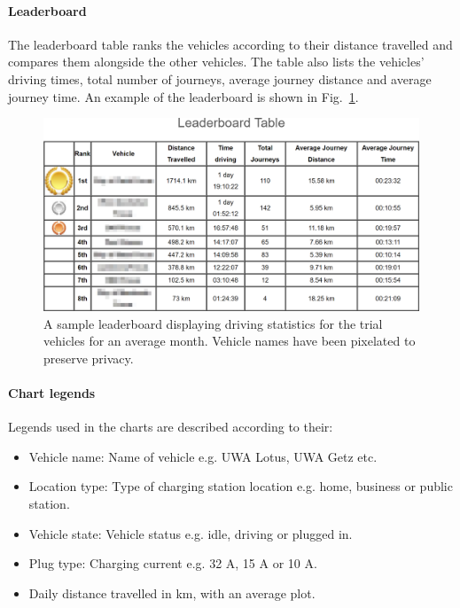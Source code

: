 \paragraph{Leaderboard} The leaderboard table ranks the vehicles according to their distance travelled and compares them alongside the other vehicles. The table also lists the vehicles’ driving times, total number of journeys, average journey distance and average journey time. An example of the leaderboard is shown in Fig.~\ref{fig:9:vt-leaderboard}.

\begin{figure}[H]
	\centering
	\includegraphics[width=\linewidth]{vt-leaderboard-crop}
	\caption[Sample leaderboard displaying driving statistics for the trial vehicles]{A sample leaderboard displaying driving statistics for the trial vehicles for an average month. Vehicle names have been pixelated to preserve privacy.}
	\label{fig:9:vt-leaderboard}
\end{figure}

\paragraph{Chart legends} Legends used in the charts are described according to their:
\begin{itemize}
	\item Vehicle name: Name of vehicle e.g. UWA Lotus, UWA Getz etc.
	\item Location type: Type of charging station location e.g. home, business or public station.
	\item Vehicle state: Vehicle status e.g. idle, driving or plugged in.
	\item Plug type: Charging current e.g. 32 A, 15 A or 10 A.
	\item Daily distance travelled in km, with an average plot.
\end{itemize}

